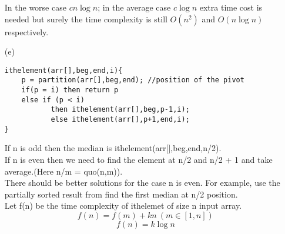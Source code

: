 \documentclass[10pt,twoside,a4paper]{article}
\begin{document}
\begin{itemize}
In the worse case $cn\log n$; in the average case $c\log n$ extra time cost is needed but surely the time complexity is still $O(n^2)$ and $O(n\log n)$ respectively.
\item[(e)]
\begin{lstlisting}
ithelement(arr[],beg,end,i){
	p = partition(arr[],beg,end); //position of the pivot
	if(p = i) then return p
	else if (p < i)
		   then ithelement(arr[],beg,p-1,i);
	 	   else ithelement(arr[],p+1,end,i);
}
\end{lstlisting}
If n is odd then the median is ithelement(arr[],beg,end,n/2).\\
If n is even then we need to find the element at n/2 and n/2 + 1 and take average.(Here n/m = quo(n,m)).\\
There should be better solutions for the case n is even. For example, use the partially sorted result from find the first median at n/2 position.\\
Let f(n) be the time complexity of ithelemet of size n input array.\\
$$f(n)=f(m)+kn \  (m\in [1,n])$$
$$f(n)=k\log n$$
\end{itemize}
\end{document}
